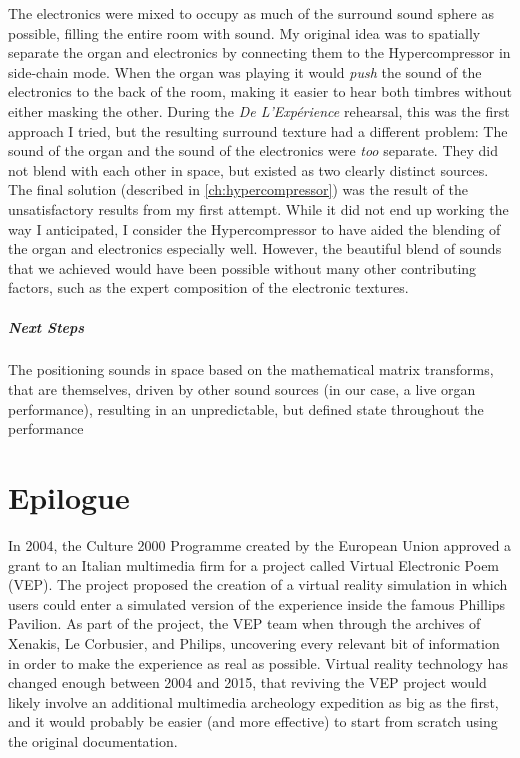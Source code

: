 The electronics were mixed to occupy as much of the surround sound
sphere as possible, filling the entire room with sound.  My original
idea was to spatially separate the organ and electronics by connecting
them to the Hypercompressor in side-chain mode.  When the organ was
playing it would \emph{push} the sound of the electronics to the back
of the room, making it easier to hear both timbres without either
masking the other.  During the \textit{De L'Exp\'{e}rience} rehearsal,
this was the first approach I tried, but the resulting surround
texture had a different problem: The sound of the organ and the sound
of the electronics were \emph{too} separate. They did not blend with
each other in space, but existed as two clearly distinct sources. The
final solution (described in \autoref{ch:hypercompressor}) was the
result of the unsatisfactory results from my first attempt. While it
did not end up working the way I anticipated, I consider the
Hypercompressor to have aided the blending of the organ and
electronics especially well. However, the beautiful blend of sounds that
we achieved would have been possible without many other contributing
factors, such as the expert composition of the electronic textures.

\paragraph{Next Steps}The positioning sounds in space based on the
mathematical matrix transforms, that are themselves, driven by other
sound sources (in our case, a live organ performance), resulting in an
unpredictable, but defined state throughout the performance


\clearpage
\chapter{Epilogue}
\label{ch:epilogue}

In 2004, the Culture 2000 Programme created by the European Union
approved a grant to an Italian multimedia firm for a project called
Virtual Electronic Poem (VEP).\cite{eu2004} The project proposed the
creation of a virtual reality simulation in which users could enter a
simulated version of the experience inside the famous Phillips
Pavilion. As part of the project, the VEP team when through the
archives of Xenakis, Le Corbusier, and Philips, uncovering every
relevant bit of information in order to make the experience as real as
possible.\cite{Lombardo2009} Virtual reality technology has changed
enough between 2004 and 2015, that reviving the VEP project would
likely involve an additional multimedia archeology expedition as big
as the first, and it would probably be easier (and more effective) to
start from scratch using the original documentation. 

